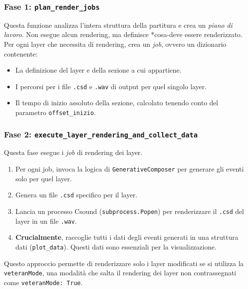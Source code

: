 \subsubsection{Fase 1: \texttt{plan\_render\_jobs}}
Questa funzione analizza l'intera struttura della partitura e crea un \textit{piano di lavoro}. Non esegue alcun rendering, ma definisce *cosa-deve essere renderizzato. Per ogni layer che necessita di rendering, crea un \textit{job}, ovvero un dizionario contenente:
\begin{itemize}
 \item La definizione del layer e della sezione a cui appartiene.
 \item I percorsi per i file \texttt{.csd} e \texttt{.wav} di output per quel singolo layer.
 \item Il tempo di inizio assoluto della sezione, calcolato tenendo conto del parametro \texttt{offset\_inizio}.
\end{itemize}
\subsubsection{Fase 2: \texttt{execute\_layer\_rendering\_and\_collect\_data}}
Questa fase esegue i \textit{job} di rendering dei layer.
\begin{enumerate}
    \item Per ogni job, invoca la logica di \texttt{GenerativeComposer} per generare gli eventi solo per quel layer.
    \item Genera un file \texttt{.csd} specifico per il layer.
    \item Lancia un processo Csound (\texttt{subprocess.Popen}) per renderizzare il \texttt{.csd} del layer in un file \texttt{.wav}.
    \item \textbf{Crucialmente}, raccoglie tutti i dati degli eventi generati in una struttura dati (\texttt{plot\_data}). Questi dati sono essenziali per la visualizzazione.
\end{enumerate}
Questo approccio permette di renderizzare solo i layer modificati se si utilizza la \texttt{veteranMode}, una modalità che salta il rendering dei layer non contrassegnati come \texttt{veteranMode: True}.
